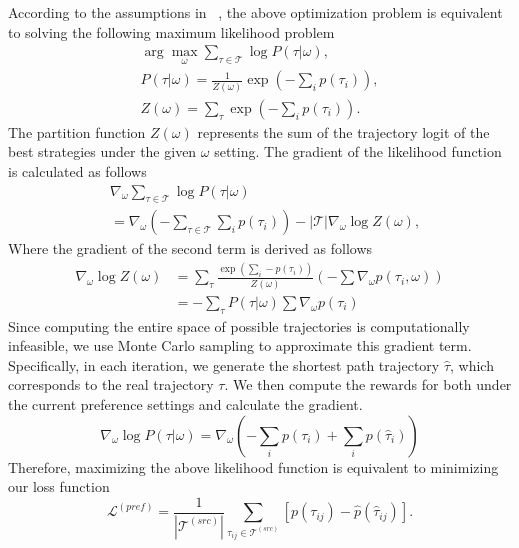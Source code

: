 According to the assumptions in ~\cite{max_ent}, 
the above optimization problem is equivalent to solving the following maximum likelihood problem
\begin{equation}
\begin{gathered}
    \arg \max_\omega \sum_{\tau\in \mathcal{T}} \log P(\tau|\omega), \\ 
    P(\tau|\omega) =\frac{1}{Z(\omega)} \exp\left(-\sum_i p(\tau_i) \right), \\
    Z(\omega) =\sum_\tau \exp\left(-\sum_i p(\tau_i)\right). 
\end{gathered}
\end{equation}
The partition function $Z(\omega)$ represents the sum of the trajectory logit of the best strategies under the given $\omega$ setting.
The gradient of the likelihood function is calculated as follows
\begin{equation}
\begin{split}
    &\nabla_\omega \sum_{\tau\in \mathcal{T}} \log P(\tau|\omega) \\
    &=\nabla_\omega\left( -\sum_{\tau\in \mathcal{T}}\sum_i p(\tau_i)\right)  - |\mathcal{T}|\nabla_\omega\log Z(\omega),     
\end{split}
\end{equation}
Where the gradient of the second term is derived as follows
\begin{equation}
\begin{split}
    \nabla_\omega \log Z(\omega) &= \sum_\tau \frac{\exp \left( \sum_i -p(\tau_i) \right)}{Z(\omega)} \left(-\sum \nabla_\omega p(\tau_i, \omega) \right) \\ 
    &=-\sum_\tau P(\tau|\omega)\sum \nabla_\omega p(\tau_i)
\end{split}
\end{equation}
Since computing the entire space of possible trajectories is computationally infeasible, we use Monte Carlo sampling to approximate this gradient term. Specifically, in each iteration, we generate the shortest path trajectory $\hat{\tau}$, which corresponds to the real trajectory $\tau$. We then compute the rewards for both under the current preference settings and calculate the gradient.
\begin{equation}
    \nabla_\omega \log P(\tau|\omega) = \nabla_\omega \left( -\sum_i p(\tau_i) + \sum_{i} p(\hat \tau_i) \right)
\end{equation}
Therefore, maximizing the above likelihood function is equivalent to minimizing our loss function
\begin{equation}
    \mathcal{L}^{(pref)} = \frac{1}{\left| \mathcal{T}^{(src)} \right|} \sum_{\tau_{ij} \in \mathcal{T}^{(src)}} \left[ p \left( \tau_{ij} \right) - \hat{p} \left( \hat{\tau}_{ij} \right)\right].
\end{equation}

